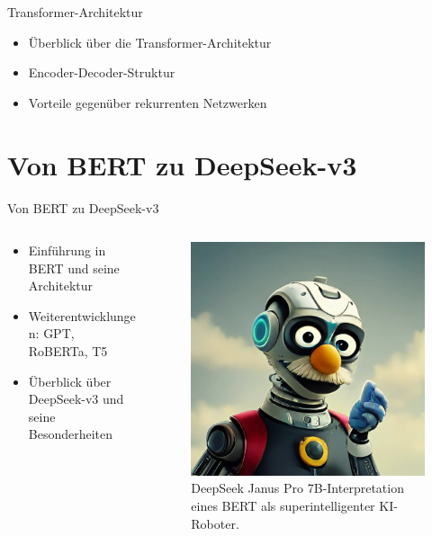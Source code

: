 \documentclass[aspectratio=1610, xcolor=dvipsnames, 9pt]{beamer}
\begin{document}
\begin{frame}{Transformer-Architektur}
  \begin{itemize}
    \item Überblick über die Transformer-Architektur
    \item Encoder-Decoder-Struktur
    \item Vorteile gegenüber rekurrenten Netzwerken
  \end{itemize}
\end{frame}

\section{Von BERT zu DeepSeek-v3}

\begin{frame}{Von BERT zu DeepSeek-v3}
  \begin{columns}
    \begin{column}{0.6\textwidth}
      \begin{itemize}
        \item Einführung in BERT und seine Architektur
        \item Weiterentwicklungen: GPT, RoBERTa, T5
        \item Überblick über DeepSeek-v3 und seine Besonderheiten
      \end{itemize}
    \end{column}
    \begin{column}{0.3\textwidth}
      \begin{figure}
        \centering
          \includegraphics[width=\textwidth]{images/mechaBERT.png}
          \caption{DeepSeek Janus Pro 7B-Interpretation eines BERT als superintelligenter KI-Roboter.}
      \end{figure}
    \end{column}
  \end{columns}
\end{frame}
\end{document}
